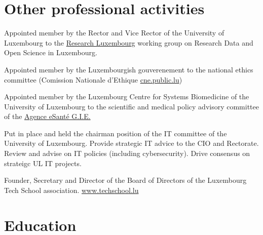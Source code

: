 \documentclass[11pt,a4paper,nolmodern,sans]{moderncv}        %
\begin{document}

\section{Other professional activities}

{Appointed member by the Rector and Vice Rector of the University of Luxembourg to the \href{https://researchluxembourg.lu/}{Research Luxembourg} working group on Research Data and Open Science in Luxembourg.}

{Appointed member by the Luxembourgish gouverenement to the national ethics committee (Comission Nationale d'Ethique \url{cne.public.lu})}

{Appointed member by the Luxembourg Centre for Systems Biomedicine of the University of Luxembourg to the scientific and medical policy advisory committee of the \href{https://sante.public.lu/fr/politique-sante/plans-action/programme-esante/agence-esante/index.html}{Agence eSanté G.I.E.}}

{Put in place and held the chairman position of the IT committee of the University of Luxembourg. Provide strategic IT advice to the CIO and Rectorate. Review and advise on IT policies (including cybersecurity). Drive consensus on strateigc UL IT projects.}

{Founder, Secretary and Director of the Board of Directors of the Luxembourg Tech School association. \url{www.techschool.lu}}



\section{Education}

\end{document}

